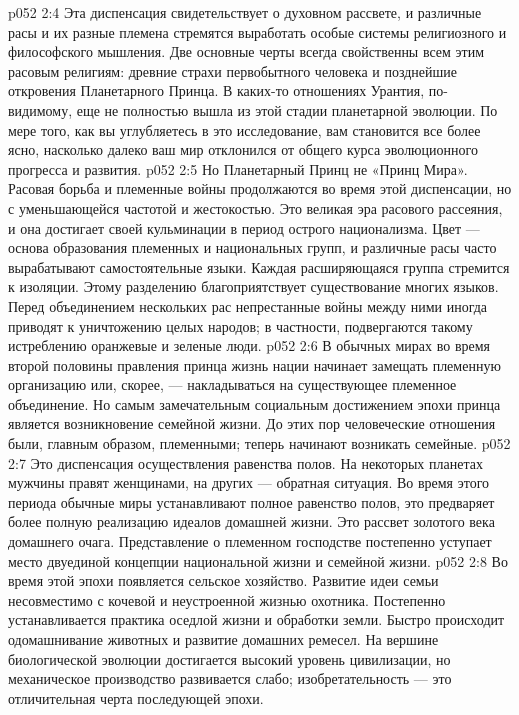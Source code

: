 \vs p052 2:4 Эта диспенсация свидетельствует о духовном рассвете, и различные расы и их разные племена стремятся выработать особые системы религиозного и философского мышления. Две основные черты всегда свойственны всем этим расовым религиям: древние страхи первобытного человека и позднейшие откровения Планетарного Принца. В каких\hyp{}то отношениях Урантия, по\hyp{}видимому, еще не полностью вышла из этой стадии планетарной эволюции. По мере того, как вы углубляетесь в это исследование, вам становится все более ясно, насколько далеко ваш мир отклонился от общего курса эволюционного прогресса и развития.
\vs p052 2:5 \pc Но Планетарный Принц не «Принц Мира». Расовая борьба и племенные войны продолжаются во время этой диспенсации, но с уменьшающейся частотой и жестокостью. Это великая эра расового рассеяния, и она достигает своей кульминации в период острого национализма. Цвет --- основа образования племенных и национальных групп, и различные расы часто вырабатывают самостоятельные языки. Каждая расширяющаяся группа стремится к изоляции. Этому разделению благоприятствует существование многих языков. Перед объединением нескольких рас непрестанные войны между ними иногда приводят к уничтожению целых народов; в частности, подвергаются такому истреблению оранжевые и зеленые люди.
\vs p052 2:6 В обычных мирах во время второй половины правления принца жизнь нации начинает замещать племенную организацию или, скорее, --- накладываться на существующее племенное объединение. Но самым замечательным социальным достижением эпохи принца является возникновение семейной жизни. До этих пор человеческие отношения были, главным образом, племенными; теперь начинают возникать семейные.
\vs p052 2:7 Это диспенсация осуществления равенства полов. На некоторых планетах мужчины правят женщинами, на других --- обратная ситуация. Во время этого периода обычные миры устанавливают полное равенство полов, это предваряет более полную реализацию идеалов домашней жизни. Это рассвет золотого века домашнего очага. Представление о племенном господстве постепенно уступает место двуединой концепции национальной жизни и семейной жизни.
\vs p052 2:8 Во время этой эпохи появляется сельское хозяйство. Развитие идеи семьи несовместимо с кочевой и неустроенной жизнью охотника. Постепенно устанавливается практика оседлой жизни и обработки земли. Быстро происходит одомашнивание животных и развитие домашних ремесел. На вершине биологической эволюции достигается высокий уровень цивилизации, но механическое производство развивается слабо; изобретательность --- это отличительная черта последующей эпохи.
